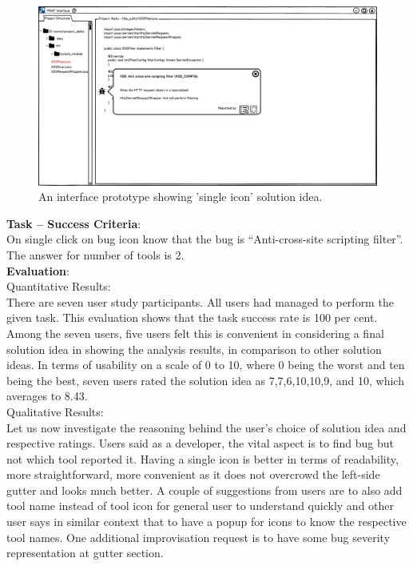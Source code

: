 \begin{figure}[hbt!]
	\centering
	\includegraphics[width=\linewidth]{figures/solution_ideas_snaps/S21_single_icon}
	\caption{An interface prototype showing 'single icon' solution idea.}
	\label{fig:S21_single_icon}
\end{figure}

\textbf{Task – Success Criteria}: \\

On single click on bug icon know that the bug is “Anti-cross-site scripting filter”. The answer for number of tools is 2. \\

\textbf{Evaluation}: \\

Quantitative Results: \\

There are seven user study participants. All users had managed to perform the given task. This evaluation shows that the task success rate is 100 per cent. \\

Among the seven users, five users felt this is convenient in considering a final solution idea in showing the analysis results, in comparison to other solution ideas. In terms of usability on a scale of 0 to 10, where 0 being the worst and ten being the best, seven users rated the solution idea as 7,7,6,10,10,9, and 10, which averages to 8.43. \\

Qualitative Results: \\

Let us now investigate the reasoning behind the user’s choice of solution idea and respective ratings. Users said as a developer, the vital aspect is to find bug but not which tool reported it. Having a single icon is better in terms of readability, more straightforward, more convenient as it does not overcrowd the left-side gutter and looks much better. A couple of suggestions from users are to also add tool name instead of tool icon for general user to understand quickly and other user says in similar context that to have a popup for icons to know the respective tool names. One additional improvisation request is to have some bug severity representation at gutter section. \\

